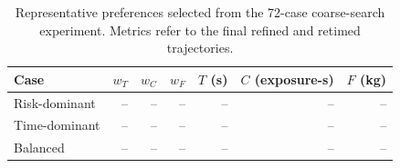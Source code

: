 \begin{table}[t]
 \centering
 \caption{Representative preferences selected from the 72-case coarse-search
 experiment. Metrics refer to the final refined and retimed trajectories.}
 \label{tab:representatives}
 \small
 \begin{tabular}{lrrrrrr}
 \hline
 Case & $w_T$ & $w_C$ & $w_F$ & $T$ (s) & $C$ (exposure-s) & $F$ (kg) \\
 \hline
 Risk-dominant & -- & -- & -- & -- & -- & -- \\
 Time-dominant & -- & -- & -- & -- & -- & -- \\
 Balanced & -- & -- & -- & -- & -- & -- \\
 \hline
 \end{tabular}
\end{table}

